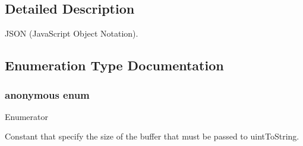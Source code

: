 \subsection{Detailed Description}
J\+S\+ON (Java\+Script Object Notation). 

\subsection{Enumeration Type Documentation}
\subsubsection[{\texorpdfstring{anonymous enum}{anonymous enum}}]{\setlength{\rightskip}{0pt plus 5cm}anonymous enum}\hypertarget{namespace_json_a0c5f614b019f20b4598dcaec09d9e820}{}\label{namespace_json_a0c5f614b019f20b4598dcaec09d9e820}
\begin{Desc}
\item[Enumerator]\par
\begin{description}
\item[{\em 
uint\+To\+String\+Buffer\+Size\hypertarget{namespace_json_a0c5f614b019f20b4598dcaec09d9e820ae4f2008c7919f20d81286121d1374424}{}\label{namespace_json_a0c5f614b019f20b4598dcaec09d9e820ae4f2008c7919f20d81286121d1374424}
}]Constant that specify the size of the buffer that must be passed to uint\+To\+String. \end{description}
\end{Desc}
